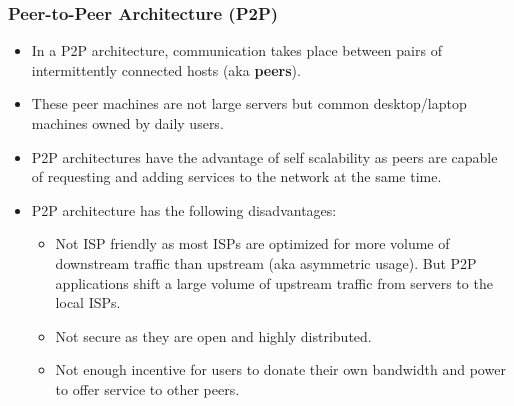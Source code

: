 \documentclass{article}
\theoremstyle{plain}
\theoremstyle{definition}
\begin{document}
\subsubsection{Peer-to-Peer Architecture (P2P)}
\begin{itemize}
    \item In a P2P architecture, communication takes place between pairs of intermittently connected hosts (aka \textbf{peers}). 
    
    \item These peer machines are not large servers but common desktop/laptop machines owned by daily users. 
    
    \item P2P architectures have the advantage of self scalability as peers are capable of requesting and adding services to the network at the same time.
    
    \item P2P architecture has the following disadvantages:
    \begin{itemize}
        \item Not ISP friendly as most ISPs are optimized for more volume of downstream traffic than upstream (aka asymmetric usage). But P2P applications shift a large volume of upstream traffic from servers to the local ISPs.
        
        \item Not secure as they are open and highly distributed.
        
        \item Not enough incentive for users to donate their own bandwidth and power to offer service to other peers.
    \end{itemize}
\end{itemize}
\end{document}
